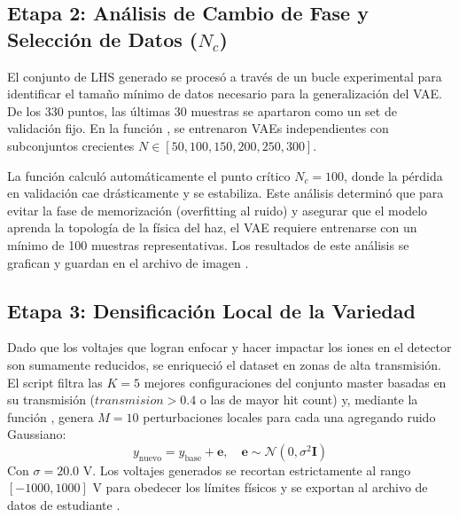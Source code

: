 \documentclass[12pt,letterpaper]{article}
\begin{document}
\subsection{Etapa 2: Análisis de Cambio de Fase y Selección de Datos ($N_c$)}
El conjunto de LHS generado se procesó a través de un bucle experimental para identificar el tamaño mínimo de datos necesario para la generalización del VAE. De los 330 puntos, las últimas $30$ muestras se apartaron como un set de validación fijo. En la función , se entrenaron VAEs independientes con subconjuntos crecientes $N \in [50, 100, 150, 200, 250, 300]$. 

La función  calculó automáticamente el punto crítico $N_c = 100$, donde la pérdida en validación cae drásticamente y se estabiliza. Este análisis determinó que para evitar la fase de memorización (overfitting al ruido) y asegurar que el modelo aprenda la topología de la física del haz, el VAE requiere entrenarse con un mínimo de 100 muestras representativas. Los resultados de este análisis se grafican y guardan en el archivo de imagen .

\subsection{Etapa 3: Densificación Local de la Variedad}
Dado que los voltajes que logran enfocar y hacer impactar los iones en el detector son sumamente reducidos, se enriqueció el dataset en zonas de alta transmisión. El script filtra las $K=5$ mejores configuraciones del conjunto master basadas en su transmisión ($transmision > 0.4$ o las de mayor hit count) y, mediante la función , genera $M=10$ perturbaciones locales para cada una agregando ruido Gaussiano:
\begin{equation}
    y_{\text{nuevo}} = y_{\text{base}} + \mathbf{e}, \quad \mathbf{e} \sim \mathcal{N}(0, \sigma^2 \mathbf{I})
\end{equation}
Con $\sigma = 20.0\text{ V}$. Los voltajes generados se recortan estrictamente al rango $[-1000, 1000]\text{ V}$ para obedecer los límites físicos y se exportan al archivo de datos de estudiante .
\end{document}
